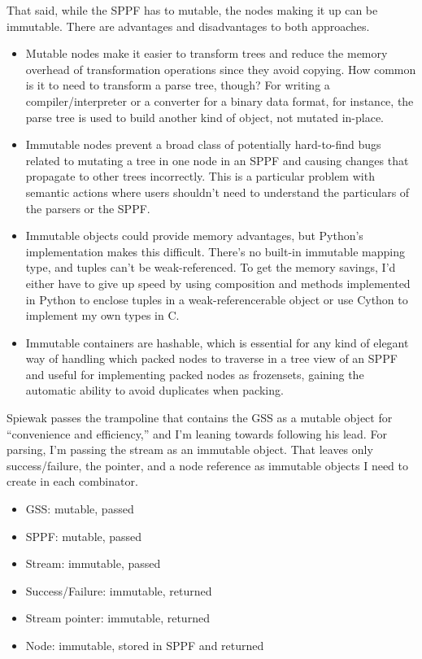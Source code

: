 \documentclass[12pt]{article}
\begin{document}
That said, while the SPPF has to mutable, the nodes making it up can
be immutable.  There are advantages and disadvantages to both
approaches.

\begin{itemize}
\item Mutable nodes make it easier to transform trees and reduce the
  memory overhead of transformation operations since they avoid
  copying.  How common is it to need to transform a parse tree,
  though?  For writing a compiler/interpreter or a converter for a
  binary data format, for instance, the parse tree is used to build
  another kind of object, not mutated in-place.
\item Immutable nodes prevent a broad class of potentially
  hard-to-find bugs related to mutating a tree in one node in an SPPF
  and causing changes that propagate to other trees incorrectly.  This
  is a particular problem with semantic actions where users shouldn't
  need to understand the particulars of the parsers or the SPPF.
\item Immutable objects could provide memory advantages, but Python's
  implementation makes this difficult.  There's no built-in immutable
  mapping type, and tuples can't be weak-referenced.  To get the
  memory savings, I'd either have to give up speed by using
  composition and methods implemented in Python to enclose tuples in a
  weak-referencerable object or use Cython to implement my own types
  in C.
\item Immutable containers are hashable, which is essential for any
  kind of elegant way of handling which packed nodes to traverse in a
  tree view of an SPPF and useful for implementing packed nodes as
  frozensets, gaining the automatic ability to avoid duplicates when
  packing.
\end{itemize}

Spiewak passes the trampoline that contains the GSS as a mutable
object for ``convenience and efficiency,'' and I'm leaning towards
following his lead.  For parsing, I'm passing the stream as an
immutable object.  That leaves only success/failure, the pointer, and
a node reference as immutable objects I need to create in each combinator.

\begin{itemize}
\item GSS: mutable, passed
\item SPPF: mutable, passed
\item Stream: immutable, passed
\item Success/Failure: immutable, returned
\item Stream pointer: immutable, returned
\item Node: immutable, stored in SPPF and returned
\end{itemize}
\end{document}
